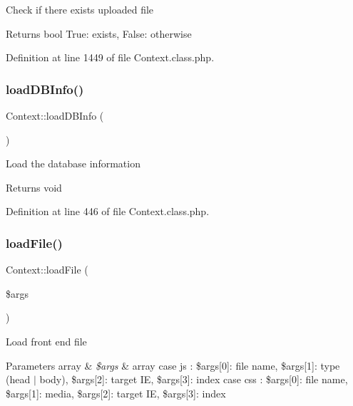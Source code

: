 Check if there exists uploaded file

\begin{DoxyReturn}{Returns}
bool True\+: exists, False\+: otherwise 
\end{DoxyReturn}


Definition at line 1449 of file Context.\+class.\+php.

\hypertarget{classContext_af9a710b382c01e18ddabc728d04f5667}{}\label{classContext_af9a710b382c01e18ddabc728d04f5667} 
\subsubsection{\texorpdfstring{load\+D\+B\+Info()}{loadDBInfo()}}
{\footnotesize\ttfamily Context\+::load\+D\+B\+Info (\begin{DoxyParamCaption}{ }\end{DoxyParamCaption})}

Load the database information

\begin{DoxyReturn}{Returns}
void 
\end{DoxyReturn}


Definition at line 446 of file Context.\+class.\+php.

\hypertarget{classContext_a01ddbd076a74f16dc46d3c7b358daea6}{}\label{classContext_a01ddbd076a74f16dc46d3c7b358daea6} 
\subsubsection{\texorpdfstring{load\+File()}{loadFile()}}
{\footnotesize\ttfamily Context\+::load\+File (\begin{DoxyParamCaption}\item[{}]{\$args }\end{DoxyParamCaption})}

Load front end file


\begin{DoxyParams}[1]{Parameters}
array & {\em \$args} & array case js \+: \$args\mbox{[}0\mbox{]}\+: file name, \$args\mbox{[}1\mbox{]}\+: type (head $\vert$ body), \$args\mbox{[}2\mbox{]}\+: target IE, \$args\mbox{[}3\mbox{]}\+: index case css \+: \$args\mbox{[}0\mbox{]}\+: file name, \$args\mbox{[}1\mbox{]}\+: media, \$args\mbox{[}2\mbox{]}\+: target IE, \$args\mbox{[}3\mbox{]}\+: index \\
\hline
\end{DoxyParams}


